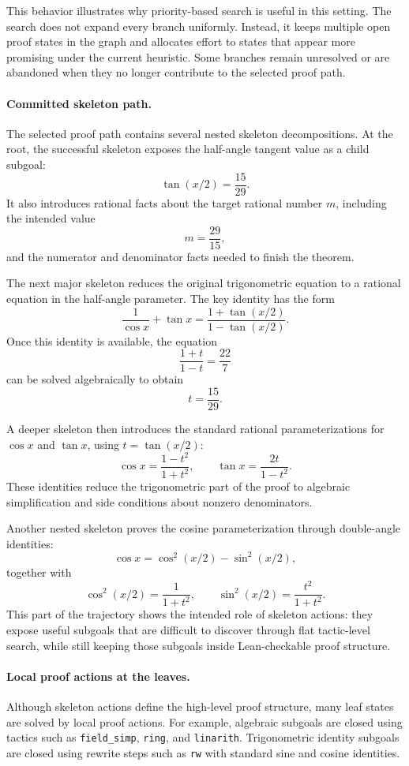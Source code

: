 \documentclass[en]{uet_awesome_thesis/uet-awesome-thesis}
\begin{document}
\begin{appendices}
This behavior illustrates why priority-based search is useful in this setting. The search does not expand every branch uniformly. Instead, it keeps multiple open proof states in the graph and allocates effort to states that appear more promising under the current heuristic. Some branches remain unresolved or are abandoned when they no longer contribute to the selected proof path.

\paragraph{Committed skeleton path.}
The selected proof path contains several nested skeleton decompositions. At the root, the successful skeleton exposes the half-angle tangent value as a child subgoal:
\[
\tan(x/2) = \frac{15}{29}.
\]
It also introduces rational facts about the target rational number \(m\), including the intended value
\[
m = \frac{29}{15},
\]
and the numerator and denominator facts needed to finish the theorem.

The next major skeleton reduces the original trigonometric equation to a rational equation in the half-angle parameter. The key identity has the form
\[
\frac{1}{\cos x} + \tan x
=
\frac{1+\tan(x/2)}{1-\tan(x/2)}.
\]
Once this identity is available, the equation
\[
\frac{1+t}{1-t} = \frac{22}{7}
\]
can be solved algebraically to obtain
\[
t = \frac{15}{29}.
\]

A deeper skeleton then introduces the standard rational parameterizations for \(\cos x\) and \(\tan x\), using \(t = \tan(x/2)\):
\[
\cos x = \frac{1-t^2}{1+t^2},
\qquad
\tan x = \frac{2t}{1-t^2}.
\]
These identities reduce the trigonometric part of the proof to algebraic simplification and side conditions about nonzero denominators.

Another nested skeleton proves the cosine parameterization through double-angle identities:
\[
\cos x = \cos^2(x/2) - \sin^2(x/2),
\]
together with
\[
\cos^2(x/2) = \frac{1}{1+t^2},
\qquad
\sin^2(x/2) = \frac{t^2}{1+t^2}.
\]
This part of the trajectory shows the intended role of skeleton actions: they expose useful subgoals that are difficult to discover through flat tactic-level search, while still keeping those subgoals inside Lean-checkable proof structure.

\paragraph{Local proof actions at the leaves.}
Although skeleton actions define the high-level proof structure, many leaf states are solved by local proof actions. For example, algebraic subgoals are closed using tactics such as \texttt{field\_simp}, \texttt{ring}, and \texttt{linarith}. Trigonometric identity subgoals are closed using rewrite steps such as \texttt{rw} with standard sine and cosine identities.


\end{appendices}
\end{document}
